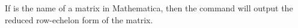 If  is the name of a matrix in Mathematica, then the command   will output the reduced row-echelon form of the matrix.